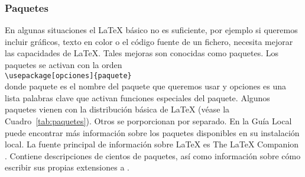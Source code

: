 				\subsubsection{Paquetes}
				En algunas situaciones el \LaTeX{} b\'asico no es suficiente, por ejemplo si queremos incluir gr\'aficos, texto 
				en color o el c\'odigo fuente de un fichero, necesita mejorar las capacidades de \LaTeX{}. Tales mejoras son 
				conocidas como paquetes. Los paquetes se activan con la orden\\
							\verb+\usepackage[opciones]{paquete}+\\
				donde paquete es el nombre del paquete que queremos usar y opciones es una lista palabras clave que activan 
				funciones especiales del paquete. Algunos paquetes vienen con la distribuci\'on b\'asica de \LaTeX{} (v\'ease la 
				Cuadro~\ref{tab:paquetes}). Otros se porporcionan por separado. En la Gu\'ia Local \cite{guiaa} puede encontrar m\'as 
				informaci\'on sobre los paquetes disponibles en su instalaci\'on local. La fuente principal de informaci\'on 
				sobre \LaTeX{} es The \LaTeX{} Companion \cite{latexcomp}. Contiene descripciones de cientos de paquetes, as\'i como 
				informaci\'on sobre c\'omo escribir sus propias extensiones a \LaTeXe{}.\\


